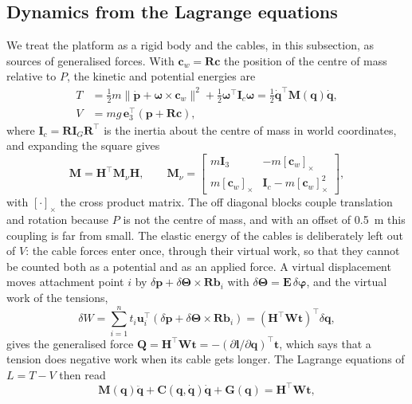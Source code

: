 \documentclass[a4paper,fleqn]{cas-dc}
\newcommand{\vc}[1]{\bm{#1}}
\newcommand{\mt}[1]{\mathbf{#1}}
\newcommand{\sk}[1]{[#1]_{\times}}
\newcommand{\eye}{\mt{I}}
\begin{document}
\subsection{Dynamics from the Lagrange equations}\label{sec:lagrange}

We treat the platform as a rigid body and the cables, in this subsection, as sources of generalised forces. With $\vc c_w=\mt R\vc c$ the position of the centre of mass relative to $P$, the kinetic and potential energies are
\begin{align}
T&=\tfrac12 m\lVert\dot{\vc p}+\vc\omega\times\vc c_w\rVert^2+\tfrac12\vc\omega^\top\mt I_c\vc\omega=\tfrac12\dot{\vc q}^\top\mt M(\vc q)\dot{\vc q},\label{eq:T}\\
V&=m g\,\vc e_3^\top(\vc p+\mt R\vc c),\label{eq:V}
\end{align}
where $\mt I_c=\mt R\mt I_G\mt R^\top$ is the inertia about the centre of mass in world coordinates, and expanding the square gives
\begin{equation}\label{eq:M}
\mt M=\mt H^\top\mt M_\nu\mt H,\qquad
\mt M_\nu=\begin{bmatrix}m\eye_3&-m\sk{\vc c_w}\\ m\sk{\vc c_w}&\mt I_c-m\sk{\vc c_w}^2\end{bmatrix},
\end{equation}
with $\sk{\cdot}$ the cross product matrix. The off diagonal blocks couple translation and rotation because $P$ is not the centre of mass, and with an offset of 0.5~m this coupling is far from small. The elastic energy of the cables is deliberately left out of $V$: the cable forces enter once, through their virtual work, so that they cannot be counted both as a potential and as an applied force. A virtual displacement moves attachment point $i$ by $\delta\vc p+\delta\vc\Theta\times\mt R\vc b_i$ with $\delta\vc\Theta=\mt E\,\delta\vc\varphi$, and the virtual work of the tensions,
\begin{equation}\label{eq:Q}
\delta W=\sum_{i=1}^n t_i\vc u_i^\top(\delta\vc p+\delta\vc\Theta\times\mt R\vc b_i)=(\mt H^\top\mt W\vc t)^\top\delta\vc q,
\end{equation}
gives the generalised force $\vc Q=\mt H^\top\mt W\vc t=-(\partial\vc l/\partial\vc q)^\top\vc t$, which says that a tension does negative work when its cable gets longer. The Lagrange equations of $L=T-V$ then read
\begin{equation}\label{eq:EL}
\mt M(\vc q)\ddot{\vc q}+\mt C(\vc q,\dot{\vc q})\dot{\vc q}+\vc G(\vc q)=\mt H^\top\mt W\vc t,
\end{equation}
\end{document}
